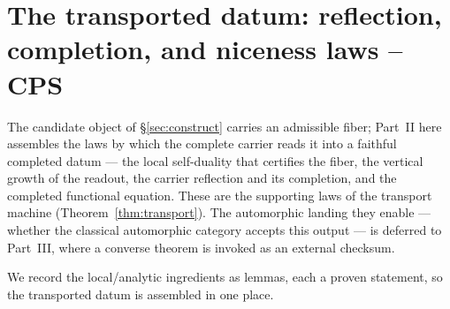 \documentclass[11pt]{article}
\theoremstyle{definition}
\begin{document}
\section{The transported datum: reflection, completion, and niceness laws -- CPS}\label{sec:converse}

The candidate object of \S\ref{sec:construct} carries an admissible fiber; Part~II here assembles the laws by
which the complete carrier reads it into a faithful completed datum --- the local self-duality that certifies
the fiber, the vertical growth of the readout, the carrier reflection and its completion, and the completed
functional equation. These are the supporting laws of the transport machine (Theorem~\ref{thm:transport}).
The automorphic landing they enable --- whether the classical automorphic category accepts this output --- is
deferred to Part~III, where a converse theorem is invoked as an external checksum.

We record the local/analytic ingredients as lemmas, each a proven statement, so the transported datum is
assembled in one place.
\end{document}
